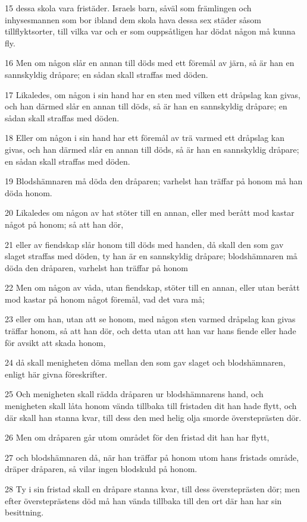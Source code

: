 \par 15 dessa skola vara fristäder. Israels barn, såväl som främlingen och inhysesmannen som bor ibland dem skola hava dessa sex städer såsom tillflyktsorter, till vilka var och er som ouppsåtligen har dödat någon må kunna fly.
\par 16 Men om någon slår en annan till döds med ett föremål av järn, så är han en sannskyldig dråpare; en sådan skall straffas med döden.
\par 17 Likaledes, om någon i sin hand har en sten med vilken ett dråpslag kan givas, och han därmed slår en annan till döds, så är han en sannskyldig dråpare; en sådan skall straffas med döden.
\par 18 Eller om någon i sin hand har ett föremål av trä varmed ett dråpslag kan givas, och han därmed slår en annan till döds, så är han en sannskyldig dråpare; en sådan skall straffas med döden.
\par 19 Blodshämnaren må döda den dråparen; varhelst han träffar på honom må han döda honom.
\par 20 Likaledes om någon av hat stöter till en annan, eller med berått mod kastar något på honom; så att han dör,
\par 21 eller av fiendskap slår honom till döds med handen, då skall den som gav slaget straffas med döden, ty han är en sannskyldig dråpare; blodshämnaren må döda den dråparen, varhelst han träffar på honom
\par 22 Men om någon av våda, utan fiendskap, stöter till en annan, eller utan berått mod kastar på honom något föremål, vad det vara må;
\par 23 eller om han, utan att se honom, med någon sten varmed dråpslag kan givas träffar honom, så att han dör, och detta utan att han var hans fiende eller hade för avsikt att skada honom,
\par 24 då skall menigheten döma mellan den som gav slaget och blodshämnaren, enligt här givna föreskrifter.
\par 25 Och menigheten skall rädda dråparen ur blodshämnarens hand, och menigheten skall låta honom vända tillbaka till fristaden dit han hade flytt, och där skall han stanna kvar, till dess den med helig olja smorde översteprästen dör.
\par 26 Men om dråparen går utom området för den fristad dit han har flytt,
\par 27 och blodshämnaren då, när han träffar på honom utom hans fristads område, dräper dråparen, så vilar ingen blodskuld på honom.
\par 28 Ty i sin fristad skall en dråpare stanna kvar, till dess översteprästen dör; men efter översteprästens död må han vända tillbaka till den ort där han har sin besittning.
